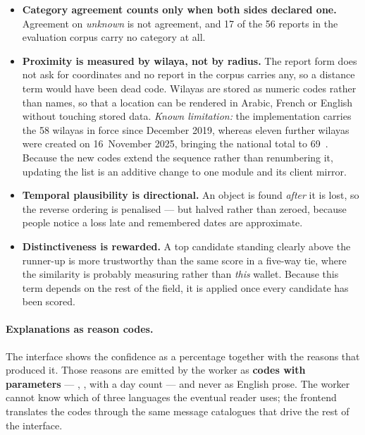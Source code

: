 \begin{itemize}[leftmargin=1.4em,itemsep=3pt]
  \item \textbf{Category agreement counts only when both sides declared one.}
        Agreement on \emph{unknown} is not agreement, and 17 of the 56 reports
        in the evaluation corpus carry no category at all.
  \item \textbf{Proximity is measured by wilaya, not by radius.} The report form
        does not ask for coordinates and no report in the corpus carries any, so
        a distance term would have been dead code. Wilayas are stored as
        numeric codes rather than names, so that a location can be rendered in
        Arabic, French or English without touching stored data.
        \emph{Known limitation:} the implementation carries the 58 wilayas in
        force since December 2019, whereas eleven further wilayas were created
        on 16~November 2025, bringing the national total to
        69~\cite{wilayas2025}. Because the new codes extend the sequence rather
        than renumbering it, updating the list is an additive change to one
        module and its client mirror.
  \item \textbf{Temporal plausibility is directional.} An object is found
        \emph{after} it is lost, so the reverse ordering is penalised --- but
        halved rather than zeroed, because people notice a loss late and
        remembered dates are approximate.
  \item \textbf{Distinctiveness is rewarded.} A top candidate standing clearly
        above the runner-up is more trustworthy than the same score in a
        five-way tie, where the similarity is probably measuring  rather than \emph{this} wallet. Because this term depends
        on the rest of the field, it is applied once every candidate has been
        scored.
\end{itemize}

\paragraph{Explanations as reason codes.} The interface shows the confidence as
a percentage together with the reasons that produced it. Those reasons are
emitted by the worker as \textbf{codes with parameters} --- ,
,  with a day count --- and never as
English prose. The worker cannot know which of three languages the eventual
reader uses; the frontend translates the codes through the same message
catalogues that drive the rest of the interface.

